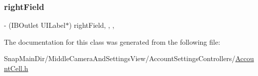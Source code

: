 \hypertarget{interface_account_cell_a9c27b0dbe68965b4d3460ddc0ed8ffa1}{}\label{interface_account_cell_a9c27b0dbe68965b4d3460ddc0ed8ffa1} 
\subsubsection{\texorpdfstring{right\+Field}{rightField}}
{\footnotesize\ttfamily -\/ (I\+B\+Outlet U\+I\+Label$\ast$) right\+Field\hspace{0.3cm}{\ttfamily [read]}, {\ttfamily [write]}, {\ttfamily [nonatomic]}, {\ttfamily [weak]}}



The documentation for this class was generated from the following file\+:\begin{DoxyCompactItemize}
\item 
Snap\+Main\+Dir/\+Middle\+Camera\+And\+Settings\+View/\+Account\+Settings\+Controllers/\hyperlink{_account_cell_8h}{Account\+Cell.\+h}\end{DoxyCompactItemize}
